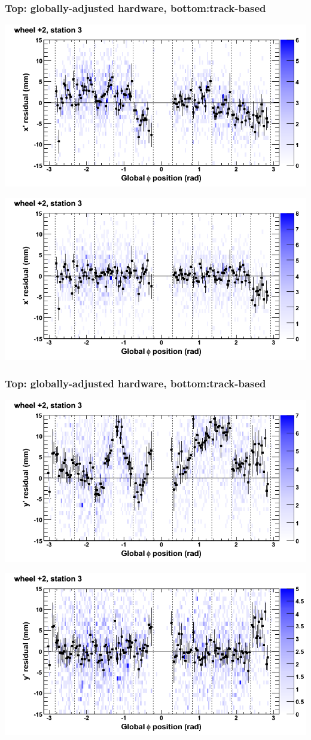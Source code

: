 \documentclass[compress]{beamer}
\begin{document}
\begin{frame}
\frametitle{Top: globally-adjusted hardware, bottom:track-based}
\includegraphics[width=0.7\linewidth]{NOV4_mapplots_HW/DTvsphi_st3whE_x.png}

\includegraphics[width=0.7\linewidth]{NOV4_mapplots/DTvsphi_st3whE_x.png}
\end{frame}

\begin{frame}
\frametitle{Top: globally-adjusted hardware, bottom:track-based}
\includegraphics[width=0.7\linewidth]{NOV4_mapplots_HW/DTvsphi_st3whE_y.png}

\includegraphics[width=0.7\linewidth]{NOV4_mapplots/DTvsphi_st3whE_y.png}
\end{frame}
\end{document}

